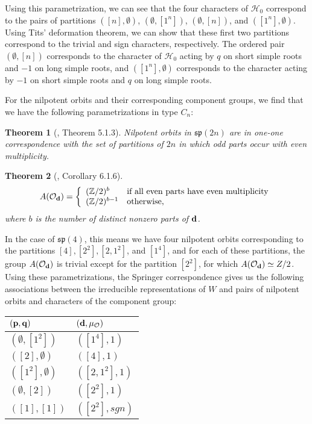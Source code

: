 \documentclass[11pt,letterpaper]{article}
\newcommand{\Z}{\mathbb{Z}}
\newcommand{\calH}{\mathcal{H}} %
\newcommand{\calO}{\mathcal{O}} %
\newcommand{\goth}{\mathfrak}
\renewcommand{\sp}{\goth{sp}}
\newtheorem{Theorem}{Theorem}[section]
\theoremstyle{remark}
\numberwithin{equation}{section}
\begin{document}
Using this parametrization, we can see that the four characters of $\calH_0$ correspond to the pairs of partitions $([n],\emptyset)$, $(\emptyset,[1^n])$, $(\emptyset,[n])$, and $([1^n],\emptyset)$. Using Tits' deformation theorem, we can show that these first two partitions correspond to the trivial and sign characters, respectively. The ordered pair $(\emptyset,[n])$ corresponds to the character of $\calH_0$ acting by $q$ on short simple roots and $-1$ on long simple roots, and $([1^n],\emptyset)$ corresponds to the character acting by $-1$ on short simple roots and $q$ on long simple roots. %

For the nilpotent orbits and their corresponding component groups, we find that we have the following parametrizations in type $C_n$:

\begin{Theorem}[\cite{CM}, Theorem 5.1.3]\label{thm:orbits2}
Nilpotent orbits in $\sp(2n)$ are in one-one correspondence with the set of partitions of $2n$ in which odd parts occur with even multiplicity.
\end{Theorem}

\begin{Theorem}[\cite{CM}, Corollary 6.1.6]\label{thm:orbits}
$$A(\calO_{{\bf d}}) = \left\{\begin{array}{ll} (\Z/2)^b & \textup{if all even parts have even multiplicity} \\ (\Z/2)^{b-1} & \textup{otherwise,}\end{array}\right.$$ where $b$ is the number of distinct nonzero parts of ${\bf d}$.
\end{Theorem}

In the case of $\sp(4)$, this means we have four nilpotent orbits corresponding to the partitions $[4],[2^2],[2,1^2]$, and $[1^4]$, and for each of these partitions, the group $A(\calO_{{\bf d}})$ is trivial except for the partition $[2^2]$, for which $A(\calO_{{\bf d}}) \simeq Z/2$. Using these parametrizations, the Springer correspondence gives us the following associations between the irreducible representations of $W$ and pairs of nilpotent orbits and characters of the component group:\\

\begin{center}
\begin{tabular}{|l|l|}
\hline
$({\bf p},{\bf q})$ & $({\bf d},\mu_{\calO})$ \\
\hline
$(\emptyset,[1^2])$ & $([1^4], 1)$ \\
\hline
$([2],\emptyset)$ & $([4], 1)$ \\
\hline
$([1^2],\emptyset)$ & $([2,1^2], 1)$ \\
\hline
$(\emptyset,[2])$ & $([2^2], 1)$ \\
\hline
$([1],[1])$ & $([2^2], sgn)$ \\
\hline
\end{tabular}
\end{center}
\end{document}
